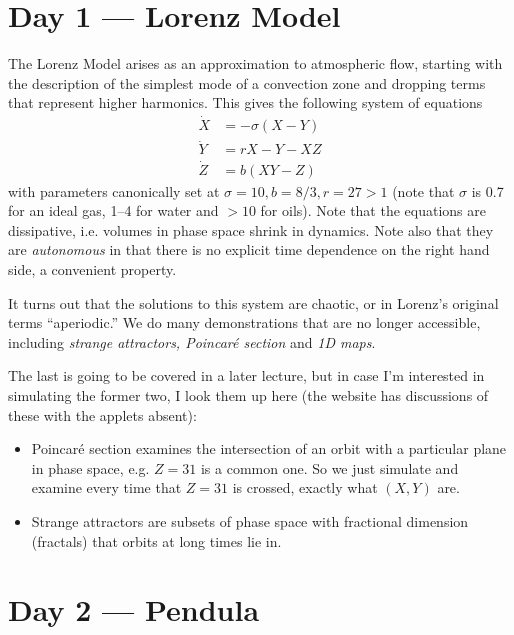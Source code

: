 \documentclass[10pt]{article}
\begin{document}
\pagestyle{fancy}
\cfoot{\thepage/\pageref{LastPage}}

\tableofcontents
\clearpage

\section{Day 1 --- Lorenz Model}

The Lorenz Model arises as an approximation to atmospheric flow, starting with the description of the simplest mode of a convection zone and dropping terms that represent higher harmonics. This gives the following system of equations
\begin{align}
    \dot{X} &= -\sigma(X - Y) \nonumber\\
    \dot{Y} &= rX - Y - XZ \nonumber\\
    \dot{Z} &= b(XY - Z)
\end{align}
with parameters canonically set at $\sigma = 10, b = 8/3, r =27 > 1$ (note that $\sigma$ is 0.7 for an ideal gas, 1--4 for water and $>10$ for oils). Note that the equations are dissipative, i.e. volumes in phase space shrink in dynamics. Note also that they are \emph{autonomous} in that there is no explicit time dependence on the right hand side, a convenient property.

It turns out that the solutions to this system are chaotic, or in Lorenz's original terms ``aperiodic.'' We do many demonstrations that are no longer accessible, including \emph{strange attractors, Poincar\'e section} and \emph{1D maps}.

The last is going to be covered in a later lecture, but in case I'm interested in simulating the former two, I look them up here (the website has discussions of these with the applets absent):
\begin{itemize}
    \item Poincar\'e section examines the intersection of an orbit with a particular plane in phase space, e.g. $Z=31$ is a common one. So we just simulate and examine every time that $Z=31$ is crossed, exactly what $(X,Y)$ are.
    \item Strange attractors are subsets of phase space with fractional dimension (fractals) that orbits at long times lie in.
\end{itemize}

\section{Day 2 --- Pendula}
\end{document}
